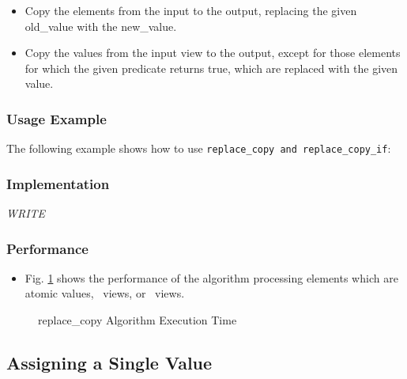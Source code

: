 \begin{itemize}
\item
Copy the elements from the input to the output, replacing the given old\_value with the new\_value. 
\item
Copy the values from the input view to the output, except for those elements for which the given predicate returns true, which are replaced with the given value. 
\end{itemize}
 
\subsubsection{Usage Example} %

The following example shows how to use \texttt{replace\_copy and replace\_copy\_if}:

 
\subsubsection{Implementation} %

\textit{WRITE}

\subsubsection{Performance} %

\begin{itemize}
\item
Fig. \ref{fig:repl-copy-alg-exec-exper}
shows the performance of the algorithm processing
elements which are atomic values, \stl\ views, or \stapl\ views.
\end{itemize}

\begin{figure}[p]
\caption{replace\_copy Algorithm Execution Time}
\label{fig:repl-copy-alg-exec-exper}
\end{figure}


\subsection{Assigning a Single Value} \label{sec-muta-fill}

